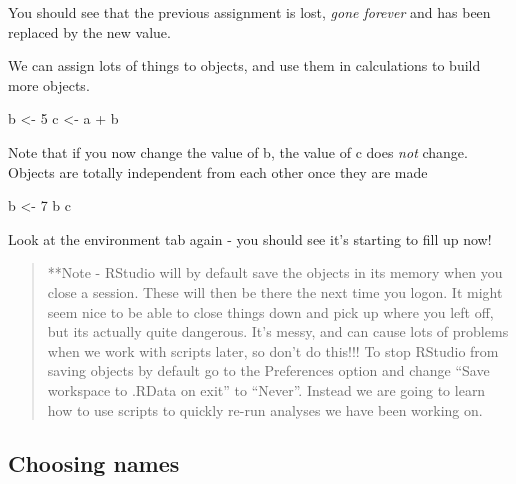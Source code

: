 \documentclass[
]{book}
\newenvironment{Shaded}{\begin{snugshade}}{\end{snugshade}}
\newcommand{\DecValTok}[1]{\textcolor[rgb]{0.00,0.00,0.81}{#1}}
\newcommand{\NormalTok}[1]{#1}
\newcommand{\OtherTok}[1]{\textcolor[rgb]{0.56,0.35,0.01}{#1}}
\newcommand{\SpecialCharTok}[1]{\textcolor[rgb]{0.00,0.00,0.00}{#1}}
\begin{document}
You should see that the previous assignment is lost, \emph{gone forever} and has been replaced by the new value.

We can assign lots of things to objects, and use them in calculations to build more objects.

\begin{Shaded}
\begin{Highlighting}[]
\NormalTok{b }\OtherTok{\textless{}{-}} \DecValTok{5}
\NormalTok{c }\OtherTok{\textless{}{-}}\NormalTok{ a }\SpecialCharTok{+}\NormalTok{ b}
\end{Highlighting}
\end{Shaded}

Note that if you now change the value of b, the value of c does \emph{not} change. Objects are totally independent from each other once they are made

\begin{Shaded}
\begin{Highlighting}[]
\NormalTok{b }\OtherTok{\textless{}{-}} \DecValTok{7}
\NormalTok{b}
\NormalTok{c}
\end{Highlighting}
\end{Shaded}

Look at the environment tab again - you should see it's starting to fill up now!

\begin{quote}
**Note - RStudio will by default save the objects in its memory when you close a session. These will then be there the next time you logon. It might seem nice to be able to close things down and pick up where you left off, but its actually quite dangerous. It's messy, and can cause lots of problems when we work with scripts later, so don't do this!!! To stop RStudio from saving objects by default go to the Preferences option and change ``Save workspace to .RData on exit'' to ``Never''. Instead we are going to learn how to use scripts to quickly re-run analyses we have been working on.
\end{quote}

\hypertarget{choosing-names}{%
\subsection{Choosing names}\label{choosing-names}}
\end{document}
